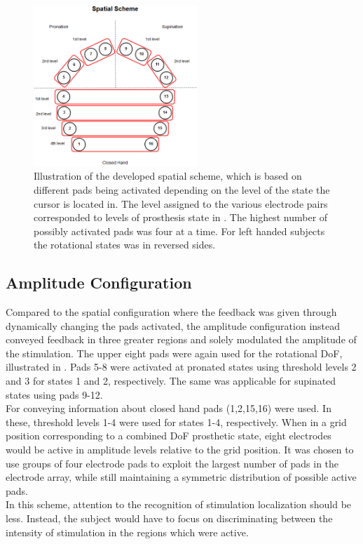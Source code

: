\begin{figure}[H]                 
	\includegraphics[width=0.55\textwidth]{figures/El_array_spatial}  
	\caption{Illustration of the developed spatial scheme, which is based on different pads being activated depending on the level of the state the cursor is located in. The level assigned to the various electrode pairs corresponded to levels of prosthesis state in . The highest number of possibly activated pads was four at a time. For left handed subjects the rotational states was in reversed sides.}
	\label{fig:spatial} 
\end{figure}


\subsection{Amplitude Configuration}

Compared to the spatial configuration where the feedback was given through dynamically changing the pads activated, the amplitude configuration instead conveyed feedback in three greater regions and solely modulated the amplitude of the stimulation. The upper eight pads were again used for the rotational DoF, illustrated in . Pads 5-8 were activated at pronated states using threshold levels 2 and 3 for states 1 and 2, respectively. The same was applicable for supinated states using pads 9-12. \\
For conveying information about closed hand pads (1,2,15,16) were used. In these, threshold levels 1-4 were used for states 1-4, respectively. When in a grid position corresponding to a combined DoF prosthetic state, eight electrodes would be active in amplitude levels relative to the grid position. It was chosen to use groups of four electrode pads to exploit the largest number of pads in the electrode array, while still maintaining a symmetric distribution of possible active pads. \\ 
In this scheme, attention to the recognition of stimulation localization should be less. Instead, the subject would have to focus on discriminating between the intensity of stimulation in the regions which were active.           

